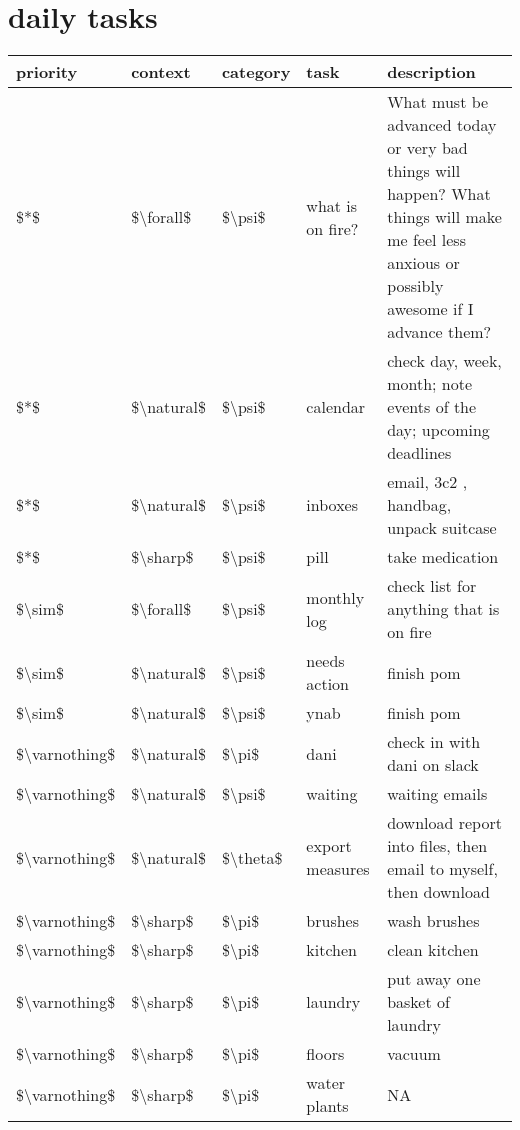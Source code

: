 \documentclass[]{book}
\begin{document}
\hypertarget{daily-tasks}{%
\section{daily tasks}\label{daily-tasks}}

\begin{tabular}{l|l|l|l|l}
\hline
priority & context & category & task & description\\
\hline
\$*\$ & \$\textbackslash{}forall\$ & \$\textbackslash{}psi\$ & what is on fire? & What must be advanced today or very bad things will happen? What things will make me feel less anxious or possibly awesome if I advance them?\\
\hline
\$*\$ & \$\textbackslash{}natural\$ & \$\textbackslash{}psi\$ & calendar & check day, week, month; note events of the day; upcoming deadlines\\
\hline
\$*\$ & \$\textbackslash{}natural\$ & \$\textbackslash{}psi\$ & inboxes & email, 3c2 , handbag, unpack suitcase\\
\hline
\$*\$ & \$\textbackslash{}sharp\$ & \$\textbackslash{}psi\$ & pill & take medication\\
\hline
\$\textbackslash{}sim\$ & \$\textbackslash{}forall\$ & \$\textbackslash{}psi\$ & monthly log & check list for anything that is on fire\\
\hline
\$\textbackslash{}sim\$ & \$\textbackslash{}natural\$ & \$\textbackslash{}psi\$ & needs action & finish pom\\
\hline
\$\textbackslash{}sim\$ & \$\textbackslash{}natural\$ & \$\textbackslash{}psi\$ & ynab & finish pom\\
\hline
\$\textbackslash{}varnothing\$ & \$\textbackslash{}natural\$ & \$\textbackslash{}pi\$ & dani & check in with dani on slack\\
\hline
\$\textbackslash{}varnothing\$ & \$\textbackslash{}natural\$ & \$\textbackslash{}psi\$ & waiting & waiting emails\\
\hline
\$\textbackslash{}varnothing\$ & \$\textbackslash{}natural\$ & \$\textbackslash{}theta\$ & export measures & download report into files, then email to myself, then download\\
\hline
\$\textbackslash{}varnothing\$ & \$\textbackslash{}sharp\$ & \$\textbackslash{}pi\$ & brushes & wash brushes\\
\hline
\$\textbackslash{}varnothing\$ & \$\textbackslash{}sharp\$ & \$\textbackslash{}pi\$ & kitchen & clean kitchen\\
\hline
\$\textbackslash{}varnothing\$ & \$\textbackslash{}sharp\$ & \$\textbackslash{}pi\$ & laundry & put away one basket of laundry\\
\hline
\$\textbackslash{}varnothing\$ & \$\textbackslash{}sharp\$ & \$\textbackslash{}pi\$ & floors & vacuum\\
\hline
\$\textbackslash{}varnothing\$ & \$\textbackslash{}sharp\$ & \$\textbackslash{}pi\$ & water plants & NA\\
\hline
\end{tabular}
\end{document}
